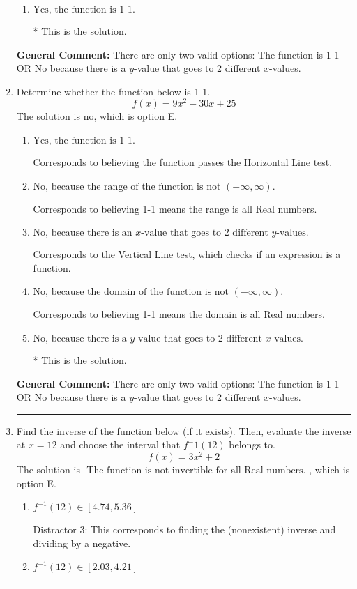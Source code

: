 \documentclass{extbook}[14pt]
\newcommand{\litem}[1]{\item #1

\rule{\textwidth}{0.4pt}}
\begin{document}
\begin{enumerate}
{\begin{enumerate}[label=\Alph*.]
Corresponds to the Horizontal Line test, which this function passes.
\item \( \text{Yes, the function is 1-1.} \)

* This is the solution.
\end{enumerate}

\textbf{General Comment:} There are only two valid options: The function is 1-1 OR No because there is a $y$-value that goes to 2 different $x$-values.
}
\litem{
Determine whether the function below is 1-1.
\[ f(x) = 9 x^2 - 30 x + 25 \]The solution is \( \text{no} \), which is option E.\begin{enumerate}[label=\Alph*.]
\item \( \text{Yes, the function is 1-1.} \)

Corresponds to believing the function passes the Horizontal Line test.
\item \( \text{No, because the range of the function is not $(-\infty, \infty)$.} \)

Corresponds to believing 1-1 means the range is all Real numbers.
\item \( \text{No, because there is an $x$-value that goes to 2 different $y$-values.} \)

Corresponds to the Vertical Line test, which checks if an expression is a function.
\item \( \text{No, because the domain of the function is not $(-\infty, \infty)$.} \)

Corresponds to believing 1-1 means the domain is all Real numbers.
\item \( \text{No, because there is a $y$-value that goes to 2 different $x$-values.} \)

* This is the solution.
\end{enumerate}

\textbf{General Comment:} There are only two valid options: The function is 1-1 OR No because there is a $y$-value that goes to 2 different $x$-values.
}
\litem{
Find the inverse of the function below (if it exists). Then, evaluate the inverse at $x = 12$ and choose the interval that $f^-1(12)$ belongs to.
\[ f(x) = 3 x^2 + 2 \]The solution is \( \text{ The function is not invertible for all Real numbers. } \), which is option E.\begin{enumerate}[label=\Alph*.]
\item \( f^{-1}(12) \in [4.74, 5.36] \)

 Distractor 3: This corresponds to finding the (nonexistent) inverse and dividing by a negative.
\item \( f^{-1}(12) \in [2.03, 4.21] \)


\end{enumerate}}
\end{enumerate}
\end{document}

